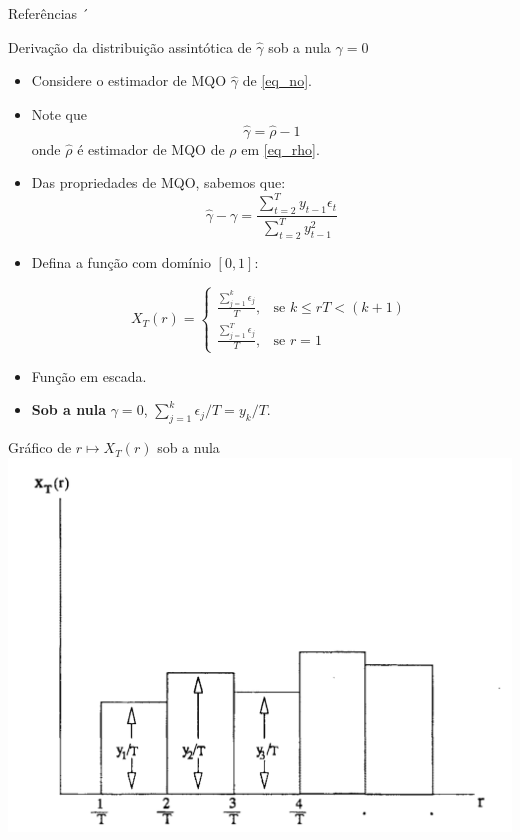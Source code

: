 \documentclass[11pt]{beamer}
\begin{document}
\begin{frame}[allowframebreaks]{Referências}
	\printbibliography´
\end{frame}

\appendix
\begin{frame}{Derivação da distribuição assintótica de $\hat{\gamma}$ sob a nula $\gamma = 0$ }
	\label{app_donsker}
	
	\begin{itemize}
		\item Considere o estimador de MQO $\hat{\gamma}$ de \eqref{eq_no}.
		\item Note que
		$$\hat{\gamma} = \hat{\rho} - 1$$
		onde $\hat{\rho}$ é estimador de MQO de $\rho$ em \eqref{eq_rho}.
		\item Das propriedades de MQO, sabemos que:
		$$\hat{\gamma} -  \gamma = \frac{\sum_{t=2}^T y_{t-1}\epsilon_t}{\sum_{t=2}^T y_{t-1}^2}$$
		\item Defina a função com domínio $[0,1]$:
		
		$$X_T(r) = \begin{cases}
						\frac{\sum_{j=1}^{k}\epsilon_j}{T},& \text{se } k\leq r T <  (k+1)\, \\
						\frac{\sum_{j=1}^{T}\epsilon_j}{T}, & \text{se } r = 1
		\end{cases}$$

		\item Função em escada.
		\item \textbf{Sob a nula} $\gamma = 0$, $\sum_{j=1}^{k}\epsilon_j/T=  y_k/T$.
	\end{itemize}
\end{frame}

\begin{frame}{Gráfico de $r \mapsto X_T(r)$ sob a nula}
	\centering
	\includegraphics[scale=0.5]{graficos/escada.png}
\end{frame}
\end{document}
